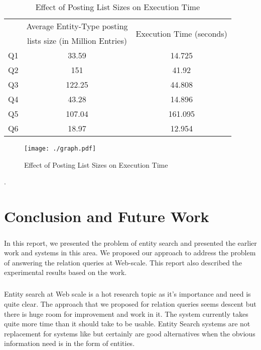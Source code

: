 \documentclass[11pt]{report}
\begin{document}
\begin{table}[htbp]
 \begin{center}
 \caption{Effect of Posting List Sizes on Execution Time}
  \label{tab:posting}
\begin{tabular}{|l|c|c|}
\hline
    & Average Entity-Type posting  &  \multirow{2}{*}{Execution Time (seconds)} \\
    & lists size (in Million Entries) & \\
  \hline
Q1  &  33.59 & 14.725 \\
  \hline
Q2  & 151 & 41.92 \\
  \hline
Q3  & 122.25 & 44.808 \\
  \hline
Q4  & 43.28 & 14.896 \\
  \hline
Q5  & 107.04 & 161.095 \\
  \hline
Q6  & 18.97 & 12.954  \\
  \hline
\end{tabular}
\end{center}
\end{table}

\begin{figure}[!htb]
\centering
\texttt{[image: ./graph.pdf]}
\caption{ Effect of Posting List Sizes on Execution Time }
\label{fig:graph}
\end{figure}
. 
\chapter{Conclusion and Future Work}
\paragraph*{}
In this report, we presented the problem of entity search and presented the earlier work and systems in this area.
We proposed our approach to address the problem of answering the relation queries at Web-scale. This report also 
described the experimental results based on the work.

\paragraph*{}
Entity search at Web scale is a hot research topic as it's importance and need is quite clear. The approach that
we proposed for relation queries seems descent but there is huge room for improvement and work in it. The system
currently takes quite more time than it should take to be usable. Entity Search systems are not replacement for systems
like \cite{pagerank} but certainly are good alternatives when the obvious information need is in the form of entities.
\end{document}
